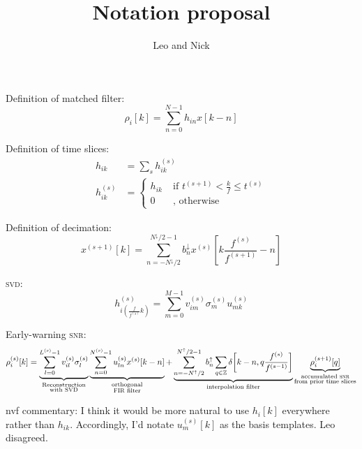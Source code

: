 \documentclass[letterpaper,11pt]{article}
\title{Notation proposal}
\author{Leo and Nick}
\begin{document}
\maketitle

Definition of matched filter:
\begin{equation}
\rho_i [k] = \sum_{n=0}^{N-1} h_{i n} x [k-n]
\end{equation}

Definition of time slices:
\begin{align}
h_{i k} &= \sum_s h_{i k}^{(s)} \\
h_{i k}^{(s)} &= \left\{ \begin{aligned}
    h_{ik} & \; \text{if } t^{(s+1)} < \frac{k}{f} \leq t^{(s)} \\
    0 & \; \text{, otherwise }
    \end{aligned} \right.
\end{align}

Definition of decimation:
\begin{equation}
x^{(s+1)}[k] = \sum_{n=-N^\downarrow/2}^{N^\downarrow/2-1} b_n^\downarrow x^{(s)}\!\left[k \frac{f^{(s)}}{f^{(s+1)}} - n\right]
\end{equation}

\textsc{svd}:
\begin{equation}
h^{(s)}_{i\left(\frac{f}{f^{(s)}} k\right)} = \sum_{m=0}^{M-1} v^{(s)}_{im} \sigma^{(s)}_m u^{(s)}_{mk}
\end{equation}

Early-warning \textsc{snr}:
\begin{equation}
    \rho^{(s)}_i[k] = \underbrace{\sum_{l=0}^{L^{(s)}-1} v^{(s)}_{il} \sigma^{(s)}_l}_{\substack{\text{Reconstruction}\\ \text{with {\sc SVD}}}}
    \underbrace{\sum_{n=0}^{N^{(s)} - 1} u^{(s)}_{ln} x^{(s)}[k-n]}_{\substack{\text{orthogonal}\\ \text{{\sc FIR} filter}}} + \underbrace{\sum_{n=-N^\uparrow/2}^{N^\uparrow/2-1} b^\uparrow_n \sum_{q \in \mathbb{Z}} \delta\!\left[k-n, q \frac{f^{(s)}}{f^{(s-1)}}\right]}_\text{interpolation filter} \underbrace{\rho^{(s+1)}_i[q]}_{\substack{\text{accumulated {\sc snr}}\\ \text{from prior time slices}}}
\end{equation}

nvf commentary: I think it would be more natural to use $h_i[k]$ everywhere rather than $h_{ik}$. Accordingly, I'd notate $u^{(s)}_m[k]$ as the basis templates. Leo disagreed.
\end{document}
